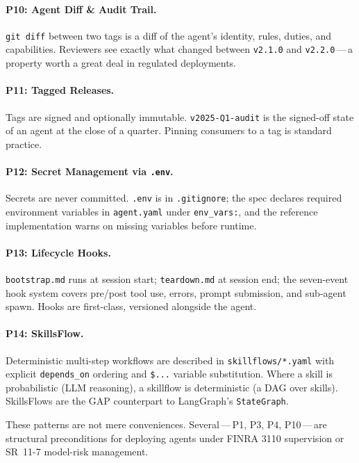 \documentclass[11pt,a4paper]{article}
\begin{document}
\paragraph{P10: Agent Diff \& Audit Trail.}
\texttt{git diff} between two tags is a diff of the agent's identity, rules, duties,
and capabilities. Reviewers see exactly what changed between \texttt{v2.1.0} and
\texttt{v2.2.0}\,---\,a property worth a great deal in regulated deployments.

\paragraph{P11: Tagged Releases.}
Tags are signed and optionally immutable. \texttt{v2025-Q1-audit} is the signed-off
state of an agent at the close of a quarter. Pinning consumers to a tag is standard
practice.

\paragraph{P12: Secret Management via \texttt{.env}.}
Secrets are never committed. \texttt{.env} is in \texttt{.gitignore}; the spec
declares required environment variables in \texttt{agent.yaml} under
\texttt{env\_vars:}, and the reference implementation warns on missing variables
before runtime.

\paragraph{P13: Lifecycle Hooks.}
\texttt{bootstrap.md} runs at session start; \texttt{teardown.md} at session end; the
seven-event hook system covers pre/post tool use, errors, prompt submission, and
sub-agent spawn. Hooks are first-class, versioned alongside the agent.

\paragraph{P14: SkillsFlow.}
Deterministic multi-step workflows are described in \texttt{skillflows/*.yaml} with
explicit \texttt{depends\_on} ordering and \texttt{\${{...}}} variable substitution.
Where a skill is probabilistic (LLM reasoning), a skillflow is deterministic (a DAG
over skills). SkillsFlows are the GAP counterpart to LangGraph's \texttt{StateGraph}.

\vspace{0.5em}
These patterns are not mere conveniences. Several\,---\,P1, P3, P4, P10\,---\,are
structural preconditions for deploying agents under FINRA 3110 supervision or
SR~11-7 model-risk management.
\end{document}

